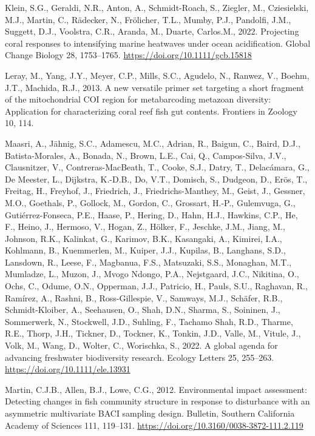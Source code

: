 \documentclass[
]{article}
\newlength{\cslhangindent}
\newlength{\cslentryspacingunit} %
\newenvironment{CSLReferences}[2] %
 {%
  \setlength{\parindent}{0pt}
  \ifodd #1
  \let\oldpar\par
  \def\par{\hangindent=\cslhangindent\oldpar}
  \fi
  \setlength{\parskip}{#2\cslentryspacingunit}
 }%
 {}
\begin{document}
\begin{CSLReferences}{1}{0}
\leavevmode{}%
Klein, S.G., Geraldi, N.R., Anton, A., Schmidt-Roach, S., Ziegler, M.,
Cziesielski, M.J., Martin, C., Rädecker, N., Frölicher, T.L., Mumby,
P.J., Pandolfi, J.M., Suggett, D.J., Voolstra, C.R., Aranda, M., Duarte,
Carlos.M., 2022. Projecting coral responses to intensifying marine
heatwaves under ocean acidification. Global Change Biology 28,
1753--1765. \url{https://doi.org/10.1111/gcb.15818}

\leavevmode{}%
Leray, M., Yang, J.Y., Meyer, C.P., Mills, S.C., Agudelo, N., Ranwez,
V., Boehm, J.T., Machida, R.J., 2013. A new versatile primer set
targeting a short fragment of the mitochondrial COI region for
metabarcoding metazoan diversity: Application for characterizing coral
reef fish gut contents. Frontiers in Zoology 10, 114.

\leavevmode{}%
Maasri, A., Jähnig, S.C., Adamescu, M.C., Adrian, R., Baigun, C., Baird,
D.J., Batista-Morales, A., Bonada, N., Brown, L.E., Cai, Q.,
Campos-Silva, J.V., Clausnitzer, V., Contreras-MacBeath, T., Cooke,
S.J., Datry, T., Delacámara, G., De Meester, L., Dijkstra, K.-D.B., Do,
V.T., Domisch, S., Dudgeon, D., Erös, T., Freitag, H., Freyhof, J.,
Friedrich, J., Friedrichs-Manthey, M., Geist, J., Gessner, M.O.,
Goethals, P., Gollock, M., Gordon, C., Grossart, H.-P., Gulemvuga, G.,
Gutiérrez-Fonseca, P.E., Haase, P., Hering, D., Hahn, H.J., Hawkins,
C.P., He, F., Heino, J., Hermoso, V., Hogan, Z., Hölker, F., Jeschke,
J.M., Jiang, M., Johnson, R.K., Kalinkat, G., Karimov, B.K., Kasangaki,
A., Kimirei, I.A., Kohlmann, B., Kuemmerlen, M., Kuiper, J.J., Kupilas,
B., Langhans, S.D., Lansdown, R., Leese, F., Magbanua, F.S., Matsuzaki,
S.S., Monaghan, M.T., Mumladze, L., Muzon, J., Mvogo Ndongo, P.A.,
Nejstgaard, J.C., Nikitina, O., Ochs, C., Odume, O.N., Opperman, J.J.,
Patricio, H., Pauls, S.U., Raghavan, R., Ramírez, A., Rashni, B.,
Ross-Gillespie, V., Samways, M.J., Schäfer, R.B., Schmidt-Kloiber, A.,
Seehausen, O., Shah, D.N., Sharma, S., Soininen, J., Sommerwerk, N.,
Stockwell, J.D., Suhling, F., Tachamo Shah, R.D., Tharme, R.E., Thorp,
J.H., Tickner, D., Tockner, K., Tonkin, J.D., Valle, M., Vitule, J.,
Volk, M., Wang, D., Wolter, C., Worischka, S., 2022. A global agenda for
advancing freshwater biodiversity research. Ecology Letters 25,
255--263. \url{https://doi.org/10.1111/ele.13931}

\leavevmode{}%
Martin, C.J.B., Allen, B.J., Lowe, C.G., 2012. Environmental impact
assessment: Detecting changes in fish community structure in response to
disturbance with an asymmetric multivariate BACI sampling design.
Bulletin, Southern California Academy of Sciences 111, 119--131.
\url{https://doi.org/10.3160/0038-3872-111.2.119}


\end{CSLReferences}
\end{document}
